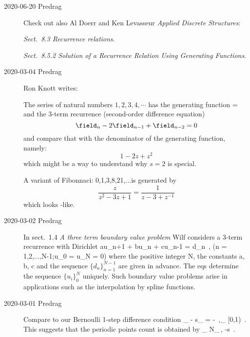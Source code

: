 \begin{description}
\item[2020-06-20 Predrag]
Check out also Al Doerr and Ken Levasseur
{{\em Applied Discrete Structures}}:

{{\em Sect.~8.3 Recurrence relations}}.

{{\em Sect.~8.5.2 Solution of a Recurrence Relation Using Generating Functions}}.

\item[2020-03-04 Predrag]
{Ron Knott} writes:

The series of natural numbers
$1, 2, 3, 4, \cdots$
has the generating function
\beq
{}=
and the 3-term  recurrence (second-order difference equation)
\[
\field_{n}-2\field_{n-1}+\field_{n-2}=0
\]
and compare that with the denominator of the generating function, namely:
\[
1-2z+z^2
\]
which might be a way to understand why $s=2$ is special.

A variant of Fibonnaci:
0,1,3,8,21,...is generated by
\[
\frac{z}{z^2-3z+1}
=
\frac{1}{z-3+z^{-1}}
\]
which looks \templatt-like.

\item[2020-03-02 Predrag]
In sect.~1.4 {\em A three term boundary value problem} Wilf
considers a 3-term recurrence with Dirichlet \bcs
\beq
au_{n+1} + bu_{n} + cu_{n-1} = d_{n} \,,\qquad
(n = 1,2,...,N-1;u_0 = u_N = 0)
where the positive integer N, the constants a, b, c and the sequence
$\{d_n\}^{N-1}_{n=1}$ are given in advance. The eqs 
determine the sequence $\{u_i\}^N_0$ uniquely. Such boundary value
problems arise in applications such as the interpolation by spline
functions.

\bigskip

\item[2020-03-01 Predrag]
Compare  to our Bernoulli 1-step difference
condition
\beq
\field_{\zeit} - {s}\field_{} = - \Ssym{\zeit}
\,,\qquad  \field_{\zeit} \in [0,1)
\,.
This suggests that the periodic points count is obtained by
\beq
\field_{\zeit} \to N_\cl{}\,,  \Ssym{\zeit} -{s}
\,.


\end{description}
